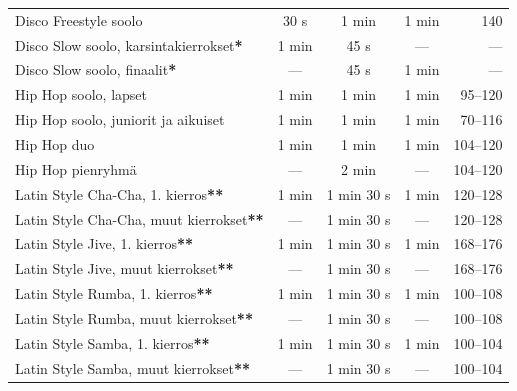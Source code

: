 \documentclass[12pt, a4paper, oneside]{article}
\begin{document}
\begin{table}[ht]
\begin{tabular}{@{\hspace{0.25cm}}lcccr@{\hspace{0.25cm}}}
        Disco Freestyle soolo                           & 30 s                & 1 min                & 1 min                  & 140            \\
        Disco Slow soolo, karsintakierrokset\textbf{*}  & 1 min               & 45 s                 & ---                    & ---            \\
        Disco Slow soolo, finaalit\textbf{*}            & ---                 & 45 s                 & 1 min                  & ---            \\ \midrule
        Hip Hop soolo, lapset                           & 1 min               & 1 min                & 1 min                  & 95--120        \\
        Hip Hop soolo, juniorit ja aikuiset             & 1 min               & 1 min                & 1 min                  & 70--116        \\
        Hip Hop duo                                     & 1 min               & 1 min                & 1 min                  & 104--120       \\
        Hip Hop pienryhmä                               & ---                 & 2 min                & ---                    & 104--120       \\ \midrule
        Latin Style Cha-Cha, 1. kierros\textbf{**}      & 1 min               & 1 min 30 s           & 1 min                  & 120--128        \\
        Latin Style Cha-Cha, muut kierrokset\textbf{**} & ---                 & 1 min 30 s           & ---                    & 120--128        \\
        Latin Style Jive, 1. kierros\textbf{**}         & 1 min               & 1 min 30 s           & 1 min                  & 168--176        \\
        Latin Style Jive, muut kierrokset\textbf{**}    & ---                 & 1 min 30 s           & ---                    & 168--176        \\
        Latin Style Rumba, 1. kierros\textbf{**}        & 1 min               & 1 min 30 s           & 1 min                  & 100--108        \\
        Latin Style Rumba, muut kierrokset\textbf{**}   & ---                 & 1 min 30 s           & ---                    & 100--108        \\
        Latin Style Samba, 1. kierros\textbf{**}        & 1 min               & 1 min 30 s           & 1 min                  & 100--104        \\
        Latin Style Samba, muut kierrokset\textbf{**}   & ---                 & 1 min 30 s           & ---                    & 100--104        \\ \bottomrule
    \end{tabular}
\end{table}
\end{document}
